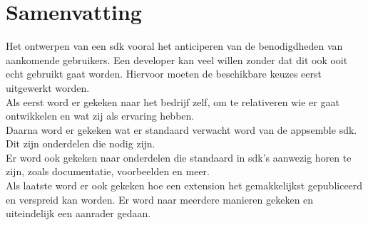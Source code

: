 \chapter{Samenvatting}

Het ontwerpen van een sdk vooral het anticiperen van de benodigdheden van aankomende gebruikers. Een developer kan veel willen zonder dat dit ook ooit echt gebruikt gaat worden. Hiervoor moeten de beschikbare keuzes eerst uitgewerkt worden. \\

Als eerst word er gekeken naar het bedrijf zelf, om te relativeren wie er gaat ontwikkelen en wat zij als ervaring hebben. \\

Daarna word er gekeken wat er standaard verwacht word van de appsemble sdk. Dit zijn onderdelen die nodig zijn. \\

Er word ook gekeken naar onderdelen die standaard in sdk's aanwezig horen te zijn, zoals documentatie, voorbeelden en meer. \\

Als laatste word er ook gekeken hoe een extension het gemakkelijkst gepubliceerd en verspreid kan worden. Er word naar meerdere manieren gekeken en uiteindelijk een aanrader gedaan.